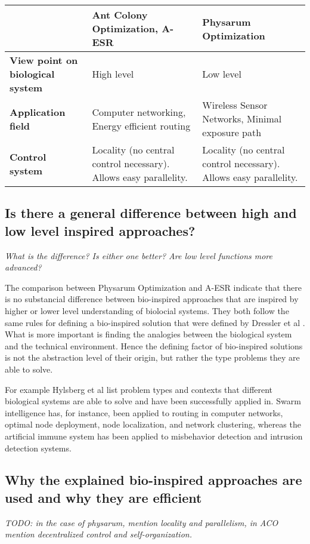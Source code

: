 \documentclass{IWORK2014}
\begin{document}
\begin{tabularx}{\textwidth}{|X|X|X|}
\hline & \textbf{Ant Colony Optimization, A-ESR} & \textbf{Physarum Optimization} \\ \hline
\textbf{View point on biological system} & High level & Low level \\ \hline
\textbf{Application field} & Computer networking, Energy efficient routing & Wireless Sensor Networks, Minimal exposure path \\ \hline
\textbf{Control system} & Locality (no central control necessary). Allows easy parallelity. & Locality (no central control necessary). Allows easy parallelity. \\ \hline
\end{tabularx}

\subsection{Is there a general difference between high and low level inspired approaches?}
\textit{What is the difference? Is either one better? Are low level functions more advanced?}

The comparison between Physarum Optimization and A-ESR indicate that there is no substancial difference between bio-inspired approaches that are inspired by higher or lower level understanding of biolocial systems. They both follow the same rules for defining a bio-inspired solution that were defined by Dressler et al \cite{dressler2010bio}. What is more important is finding the analogies between the biological system and the technical environment. Hence the defining factor of bio-inspired solutions is not the abstraction level of their origin, but rather the type problems they are able to solve.

For example Hylsberg et al \cite{hylsberg2011bioinspired} list problem types and contexts that different biological systems are able to solve and have been successfully applied in. Swarm intelligence has, for instance, been applied to routing in computer networks, optimal node deployment, node localization, and network clustering, whereas the artificial immune system has been applied to misbehavior detection and intrusion detection systems.

\subsection{Why the explained bio-inspired approaches are used and why they are efficient}
\textit{TODO: in the case of physarum, mention locality and parallelism, in ACO mention decentralized control and self-organization.}
\end{document}
